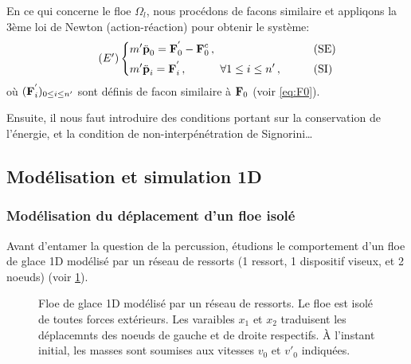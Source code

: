 En ce qui concerne le floe $\Omega_l$, nous procédons de facons similaire et appliqons la 3ème loi de Newton (action-réaction) pour obtenir le système:
\begin{align} \tag{$E'$} \label{eq:eprime}
\begin{dcases}
    m' \ddot{\bm{\mathrm{p}}}_0 = \bm{\mathrm{F}}^{'}_0 - \bm{\mathrm{F}}^c_0  \,, &\qquad \text{(SE)} \\
    m' \ddot{\bm{\mathrm{p}}}_i = \bm{\mathrm{F}}^{'}_i   \,, \quad \quad \quad \forall 1 \leq i \leq n' \,, &\qquad \text{(SI)}
\end{dcases}
\end{align}
où $(\bm{\mathrm{F}}^{'}_i)_{0 \leq i \leq n'}$ sont définis de facon similaire à $\bm{\mathrm{F}}_0$ (voir \cref{eq:F0}).

Ensuite, il nous faut introduire des conditions portant sur la conservation de l'énergie, et la condition de non-interpénétration de Signorini\dots








\subsection{Modélisation et simulation 1D}









\subsubsection{Modélisation du déplacement d'un floe isolé}

Avant d'entamer la question de la percussion, étudions le comportement d'un floe de glace 1D modélisé par un réseau de ressorts (1 ressort, 1 dispositif viseux, et 2 noeuds) (voir \cref{fig:deplacement1d}).
\begin{figure}[!h]
    \centering
    \caption{Floe de glace 1D modélisé par un réseau de ressorts. Le floe est isolé de toutes forces extérieurs. Les varaibles $x_1$ et $x_2$ traduisent les déplacemnts des noeuds de gauche et de droite respectifs. À l'instant initial, les masses sont soumises aux vitesses $v_0$ et $v'_0$ indiquées.}
    \label{fig:deplacement1d}
\end{figure}


